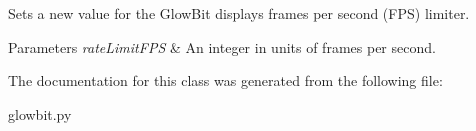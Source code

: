 Sets a new value for the Glow\+Bit display\textquotesingle{}s frames per second (F\+PS) limiter. 


\begin{DoxyParams}{Parameters}
{\em rate\+Limit\+F\+PS} & An integer in units of frames per second. \\
\hline
\end{DoxyParams}


The documentation for this class was generated from the following file\+:\begin{DoxyCompactItemize}
\item 
glowbit.\+py\end{DoxyCompactItemize}
